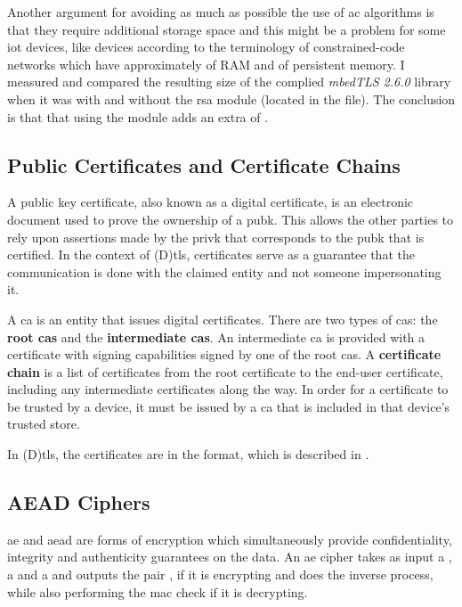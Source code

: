 \documentclass{llncs}
\begin{document}
{Another argument for avoiding as much as possible the use of \gls{ac}
algorithms is that they require additional storage space and this might be a problem for some \gls{iot} devices,
like  devices according to the terminology of constrained-code
networks\cite{RFC7228} which have approximately  of RAM and 
of persistent memory. I measured and compared the resulting size of the complied \textit{mbedTLS 2.6.0} library
\cite{SSLLibra13:online} when it was with and without the \gls{rsa} module
(located in the  file). The conclusion is that that using the  module adds an extra of .

\subsection{Public Certificates and Certificate Chains}

A public key certificate, also known as a digital certificate, is an electronic
document used to prove the ownership of a \gls{pubk}. This allows the other parties
to rely upon assertions made by the \gls{privk} that corresponds to the \gls{pubk}
that is certified. In the context of (D)\gls{tls}, certificates serve as a guarantee
that the communication is done with the claimed entity and not someone impersonating it.

A \gls{ca} is an entity that issues digital certificates. There are two types of
\gls{ca}s: the \textbf{root \gls{ca}s} and the \textbf{intermediate \gls{ca}s}.
An intermediate \gls{ca} is provided with a certificate with signing capabilities
signed by one of the root \gls{ca}s. A \textbf{certificate chain} is a list of
certificates from the root certificate to the end-user certificate, including
any intermediate certificates along the way. In order for a certificate
to be trusted by a device, it must be issued by a \gls{ca} that is included in that device's trusted store.

In (D)\gls{tls}, the certificates are in the  format, which is
described in \cite{rfc5280}.

\subsection{AEAD Ciphers}

\gls{ae} and \gls{aead} are forms of encryption which simultaneously provide
confidentiality, integrity and authenticity guarantees on the data. An \gls{ae}
cipher takes as input a , a  and a 
and outputs the pair , if it is encrypting and does the inverse
process, while also performing the \gls{mac} check if it is decrypting.

}
\end{document}
